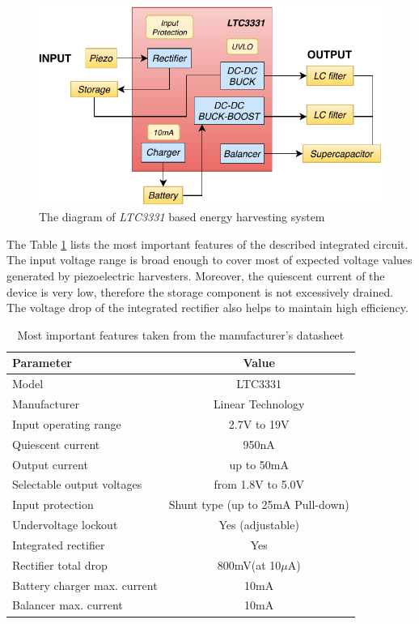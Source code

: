 \documentclass[12pt,a4paper]{article}
\begin{document}
\begin{figure}[ht!]
\includegraphics[scale=1.2]{LTC3331.pdf}
\caption{The diagram of \textit{LTC3331} based energy harvesting system}
\label{fig:ltc3331diagram}
\end{figure}
\par
The Table \ref{tab:ltc3331_params} lists the most important features of the described integrated circuit. The input voltage range is broad enough to cover most of expected voltage values generated by piezoelectric harvesters. Moreover, the quiescent current of the device is very low, therefore the storage component is not excessively drained. The voltage drop of the integrated rectifier also helps to maintain high efficiency. 
\begin{table}[ht!]
\begin{tabular}{|l|c|}
\hline
\textbf{Parameter}	& \textbf{Value} 	\\ \hline
Model  				& LTC3331       \\ \hline
Manufacturer    	& Linear Technology	\\ \hline
Input operating range      &  2.7V to 19V 		\\ \hline
Quiescent current     &  950nA			\\ \hline
Output current        &  up to 50mA			\\ \hline
Selectable output voltages & from 1.8V to 5.0V \\ \hline
Input protection &  Shunt type (up to 25mA Pull-down)\\ \hline
Undervoltage lockout 	&  Yes (adjustable)		\\ \hline
Integrated rectifier 	&  Yes 		\\ \hline
Rectifier total drop 	&  800mV(at 10$\mu$A) 		\\ \hline
Battery charger max. current 	&  10mA 		\\ \hline
Balancer max. current 	&  10mA 		\\ \hline
\end{tabular}
\caption{Most important features taken from the manufacturer's datasheet \cite{ltc3331_params}}
\label{tab:ltc3331_params}
\end{table}
\par
\end{document}
